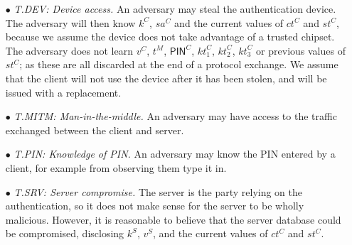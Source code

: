 \documentclass[runningheads]{llncs}
\newcommand{\sss}{\scriptscriptstyle}
\newcommand{\keyt}{\ensuremath{{kt}}}
\newcommand{\counter}{\ensuremath{{ct}}}
\newcommand{\pin}{\ensuremath{\mathsf{PIN}}}
\newcommand{\salt}{\ensuremath{{sa}}}
\newcommand{\trans}{\ensuremath{{t}}}
\renewcommand{\verifier}{\ensuremath{{v}}}
\renewcommand{\state}{\ensuremath{{st}}}
\newcommand{\VC}[1]{\ensuremath{#1^{\sss C}}}
\newcommand{\VS}[1]{\ensuremath{#1^{\sss S}}}
\newcommand{\VM}[1]{\ensuremath{#1^{\sss M}}}
\begin{document}

\begin{itemize}
\item[$\bullet$]\textit{T.DEV: Device access.} An adversary may steal the authentication device. The adversary will then know \VC{k}, \VC{\salt} and the current values of \VC{\counter} and \VC{\state}, because we assume the device does not take advantage of a trusted chipset. The adversary does not learn \VC{\verifier}, \VM{\trans}, \VC{\pin}, \VC{\keyt_{\sss 1}}, \VC{\keyt_{\sss 2}}, \VC{\keyt_{\sss 3}} or previous values of \VC{\state}; as these are all discarded at the end of a protocol exchange. We assume that the client will not use the device after it has been stolen, and will be issued with a replacement.


\item[$\bullet$]\textit{T.MITM: Man-in-the-middle.} An adversary may have access to the traffic exchanged between the client and server.

\item[$\bullet$]\textit{T.PIN: Knowledge of PIN.} An adversary may know the PIN entered by a client, for example from observing them type it in.

\item[$\bullet$]\textit{T.SRV: Server compromise.} The server is the party relying on the authentication, so it does not make sense for the server to be wholly malicious.
However, it is reasonable to believe that the server database could be compromised, disclosing \VS{k}, \VS{\verifier}, and the current values of \VC{\counter} and \VC{\state}.


\end{itemize}

\end{document}
